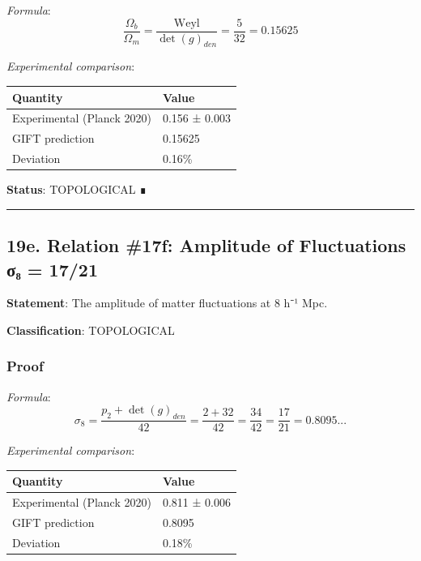 \documentclass[11pt,a4paper]{article}
\begin{document}
\emph{Formula}:
\[\frac{\Omega_b}{\Omega_m} = \frac{\text{Weyl}}{\det(g)_{den}} = \frac{5}{32} = 0.15625\]

\emph{Experimental comparison}:

{\def\LTcaptype{none} %
\begin{longtable}[]{@{}ll@{}}
\toprule\noalign{}
Quantity & Value \\
\midrule\noalign{}
\endhead
\bottomrule\noalign{}
\endlastfoot
Experimental (Planck 2020) & 0.156 ± 0.003 \\
GIFT prediction & 0.15625 \\
Deviation & 0.16\% \\
\end{longtable}
}

\textbf{Status}: TOPOLOGICAL ∎

\begin{center}\rule{0.5\linewidth}{0.5pt}\end{center}

\subsection{19e. Relation \#17f: Amplitude of Fluctuations σ₈ = 17/21}\label{e.-relation-17f-amplitude-of-fluctuations-ux3c3ux2088-1721}

\textbf{Statement}: The amplitude of matter fluctuations at 8 h⁻¹ Mpc.

\textbf{Classification}: TOPOLOGICAL

\subsubsection{Proof}\label{proof-25}

\emph{Formula}:
\[\sigma_8 = \frac{p_2 + \det(g)_{den}}{42} = \frac{2 + 32}{42} = \frac{34}{42} = \frac{17}{21} = 0.8095...\]

\emph{Experimental comparison}:

{\def\LTcaptype{none} %
\begin{longtable}[]{@{}ll@{}}
\toprule\noalign{}
Quantity & Value \\
\midrule\noalign{}
\endhead
\bottomrule\noalign{}
\endlastfoot
Experimental (Planck 2020) & 0.811 ± 0.006 \\
GIFT prediction & 0.8095 \\
Deviation & 0.18\% \\
\end{longtable}
}
\end{document}
